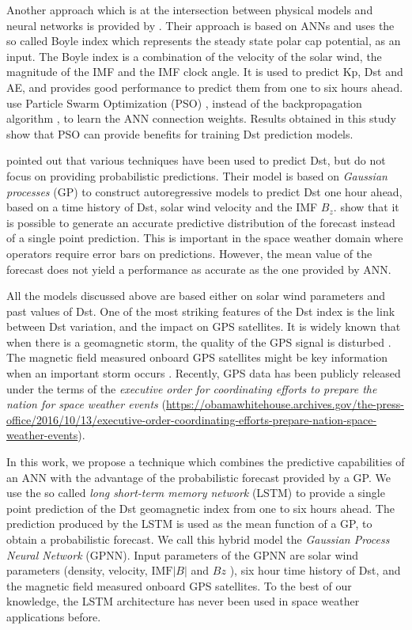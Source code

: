 Another approach which is at the intersection between physical models and neural networks is provided by 
\citet{Bala2012}. Their approach is based on ANNs and uses the so called Boyle index which represents 
the steady state polar cap potential, as an input. The Boyle index is a combination of the velocity of 
the solar wind, the magnitude of the IMF and the IMF clock angle. It is used to predict Kp, Dst and AE, 
and provides good performance to predict them from one to six hours ahead. \citet{Lazzus} use 
Particle Swarm Optimization (PSO) \citep{eberhart1995new}, instead of the backpropagation algorithm 
\citep{rummelhart1986parallel}, to learn the ANN connection weights. Results obtained in this study show 
that PSO can provide benefits for training Dst prediction models.

\citet{ChandorkarDst} pointed out that various techniques have been used to predict Dst, but do not 
focus on providing probabilistic predictions. Their model is based on \emph{Gaussian processes} (GP) to construct 
autoregressive models to predict Dst one hour ahead, based on a time history of Dst, solar wind velocity and 
the IMF $B_z$. \citet{ChandorkarDst} show that it is possible to generate an accurate predictive distribution 
of the forecast instead of a single point prediction. This is important in the space weather domain where 
operators require error bars on predictions. However, the mean value of the forecast does not yield a 
performance as accurate as the one provided by ANN. 

All the models discussed above are based either on solar wind parameters and past values of Dst. One of the most 
striking features of the Dst index is the link between Dst variation, and the impact on GPS satellites. 
It is widely known that when there is a geomagnetic storm, the quality of the GPS signal is disturbed 
\citep{astafyeva2014geomagnetic}. The magnetic field measured onboard GPS satellites might be key information 
when an important storm occurs \citep{morley2017energetic}. Recently, GPS data has been publicly released under 
the terms of the \emph{executive order for coordinating efforts to prepare the nation for space weather events} 
(\url{https://obamawhitehouse.archives.gov/the-press-office/2016/10/13/executive-order-coordinating-efforts-prepare-nation-space-weather-events}). 

In this work, we propose a technique which combines the predictive capabilities of an ANN with the advantage of the 
probabilistic forecast provided by a GP. We use the so called \emph{long short-term memory network} (LSTM) 
\citep{hochreiter1997long} to provide a single point prediction of the Dst geomagnetic index from one to six 
hours ahead. The prediction produced by the LSTM is used as the mean function of a GP, to obtain a 
probabilistic forecast. We call this hybrid model the \emph{Gaussian Process Neural Network} (GPNN). 
Input parameters of the GPNN are solar wind parameters (density, velocity,  
$\text{IMF}\vert B \vert$  and $Bz$ ), six hour time history of Dst, and the magnetic field 
measured onboard GPS satellites. To the best of our knowledge, the LSTM architecture has never 
been used in space weather applications before.

